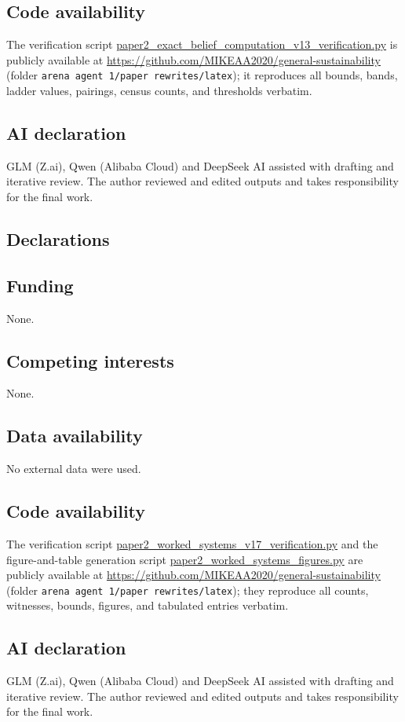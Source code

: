 \documentclass[10pt,twocolumn]{article}
\theoremstyle{plain}
\theoremstyle{definition}
\theoremstyle{remark}
\begin{document}
\subsection*{Code availability}
The verification script
\url{paper2_exact_belief_computation_v13_verification.py} is publicly
available at \url{https://github.com/MIKEAA2020/general-sustainability}
(folder \texttt{arena agent 1/paper rewrites/latex}); it reproduces all bounds, bands, ladder values, pairings,
census counts, and thresholds verbatim.

\subsection*{AI declaration}
GLM (Z.ai), Qwen (Alibaba Cloud) and DeepSeek AI assisted with drafting
and iterative review. The author reviewed and edited outputs and takes
responsibility for the final work.
\subsection*{Declarations}

\subsection*{Funding}
None.

\subsection*{Competing interests}
None.

\subsection*{Data availability}
No external data were used.

\subsection*{Code availability}
The verification script \url{paper2_worked_systems_v17_verification.py}
and the figure-and-table generation script
\url{paper2_worked_systems_figures.py} are publicly available at
\url{https://github.com/MIKEAA2020/general-sustainability} (folder
\texttt{arena agent 1/paper rewrites/latex}); they reproduce all
counts, witnesses, bounds, figures, and tabulated entries verbatim.

\subsection*{AI declaration}
GLM (Z.ai), Qwen (Alibaba Cloud) and DeepSeek AI assisted with drafting
and iterative review. The author reviewed and edited outputs and takes
responsibility for the final work.
\end{document}
